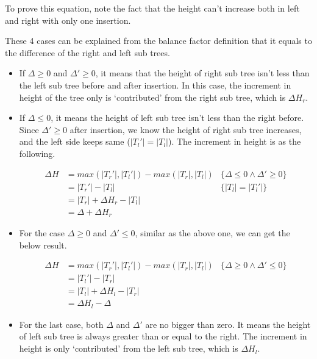 \documentclass[UTF8]{article}
\begin{document}
To prove this equation, note the fact that the height can't increase
both in left and right with only one insertion.

These 4 cases can be explained from the balance factor
definition that it equals to the difference of the right and left sub trees.

\begin{itemize}
\item If $\Delta \geq 0$ and $\Delta' \geq 0$, it means that the height
of right sub tree isn't less than the left sub tree
before and after insertion. In this case, the increment in
height of the tree only is `contributed' from the right sub tree, which
is $\Delta H_r$.

\item If $\Delta \leq 0$, it means the height of left sub tree isn't
less than the right before. Since $\Delta' \geq 0$ after insertion,
we know the height of right sub tree increases,
and the left side keeps same ($|T_l'|=|T_l|$). The increment in height is
as the following.

\[
\begin{array}{rll}
\Delta H & = max(|T_r'|, |T_l'|) - max (|T_r|, |T_l|) & \{\Delta \leq 0 \land \Delta' \geq 0 \}\\
         & = |T_r'|-|T_l| & \{|T_l|=|T_l'| \}\\
         & = |T_r|+\Delta H_r - |T_l| & \\
         & = \Delta + \Delta H_r &
\end{array}
\]

\item For the case $\Delta \geq 0$ and $\Delta' \leq 0$, similar as the
above one, we can get the below result.

\[
\begin{array}{rll}
\Delta H & = max(|T_r'|, |T_l'|) - max (|T_r|, |T_l|) & \{\Delta \geq 0 \land \Delta' \leq 0 \}\\
         & = |T_l'|-|T_r| & \\
         & = |T_l|+\Delta H_l - |T_r| & \\
         & = \Delta H_l - \Delta&
\end{array}
\]

\item For the last case, both $\Delta$ and $\Delta'$ are no bigger than
zero. It means the height of left sub tree is always greater than or equal
 to the right. The increment in height is only `contributed'
from the left sub tree, which is $\Delta H_l$.
\end{itemize}
\end{document}
